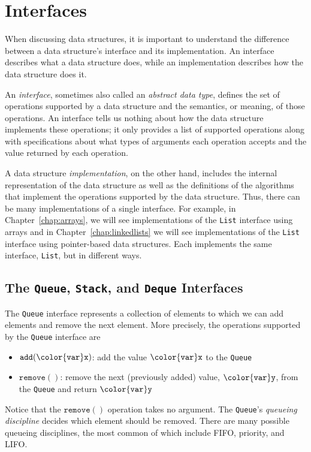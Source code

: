 \documentclass[10pt]{book}
\newcommand{\chapref}[1]{Chapter~\ref{chap:#1}}
\newcommand{\seclabel}[1]{\label{sec:#1}}
\theoremstyle{plain}
\theoremstyle{definition}
\begin{document}
\section{Interfaces}
\seclabel{interfaces}
When discussing data structures, it is important to understand the
difference between a data structure's interface and its implementation.
An interface describes what a data structure does, while an implementation
describes how the data structure does it.

An \emph{interface},
%
%
sometimes also called an \emph{abstract data
type}, defines the set of operations supported by a data structure and
the semantics, or meaning, of those operations.  An interface tells us
nothing about how the data structure implements these operations; it only
provides a list of supported operations along with specifications about
what types of arguments each operation accepts and the value returned
by each operation.

A data structure \emph{implementation}, on the other hand, includes the
internal representation of the data structure as well as the definitions
of the algorithms that implement the operations supported by the data
structure.  Thus, there can be many implementations of a single interface.
For example, in \chapref{arrays}, we will see implementations of the
\texttt{List} interface using arrays and in \chapref{linkedlists} we will
see implementations of the \texttt{List} interface using pointer-based data
structures.  Each implements the same interface, \texttt{List},
but in different ways.

\subsection{The \texttt{Queue}, \texttt{Stack}, and \texttt{Deque} Interfaces}

The \texttt{Queue} interface represents a collection of elements to which we
can add elements and remove the next element.  More precisely, the operations
supported by the \texttt{Queue} interface are
\begin{itemize}
  \item \ensuremath{\mathtt{add({\color{var}x})}}: add the value \ensuremath{\mathtt{{\color{var}x}}} to the \texttt{Queue}
  \item \ensuremath{\mathtt{remove()}}: remove the next (previously added) value, \ensuremath{\mathtt{{\color{var}y}}}, from the \texttt{Queue} and return \ensuremath{\mathtt{{\color{var}y}}}
\end{itemize}
Notice that the \ensuremath{\mathtt{remove()}} operation takes no argument.  The \texttt{Queue}'s
\emph{queueing discipline} decides which element should be removed.
There are many possible queueing disciplines, the most common of which
include FIFO, priority, and LIFO.
\end{document}
